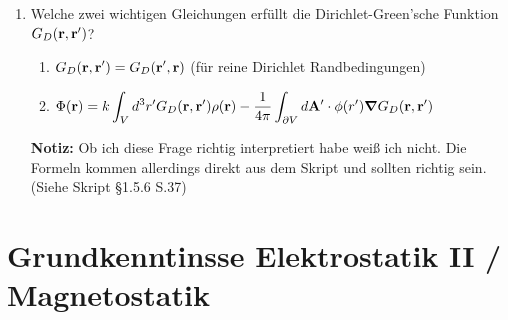 \documentclass{scrartcl}
\newcommand{\ds}{\displaystyle}
\begin{document}
\begin{enumerate}
    \clearpage
    \item Welche zwei wichtigen Gleichungen erfüllt die Dirichlet-Green'sche
          Funktion $G_D(\vb r, \vb r')$?
          \begin{center}
          \begin{enumerate}
          \item $\ds G_D(\vb r, \vb r')= G_D(\vb r', \vb r)$ 
             (für reine Dirichlet Randbedingungen)\\
          \item $\ds \Phi(\vb r)=k\int_V d^3r' G_D(\vb r, \vb r')\rho(\vb r)
             -\frac{1}{4\pi}\int_{\partial V}d\vb A'\cdot\phi(r')
             \grad G_D(\vb r, \vb r')$\\
          \end{enumerate}
          \end{center}
          \textbf{Notiz:} Ob ich diese Frage richtig interpretiert habe 
          weiß ich nicht. Die Formeln kommen allerdings direkt aus dem
          Skript und sollten richtig sein.\\
          (Siehe Skript §1.5.6 S.37)
  \end{enumerate}
  \newpage

\section{Grundkenntinsse Elektrostatik II / Magnetostatik}
\end{document}
